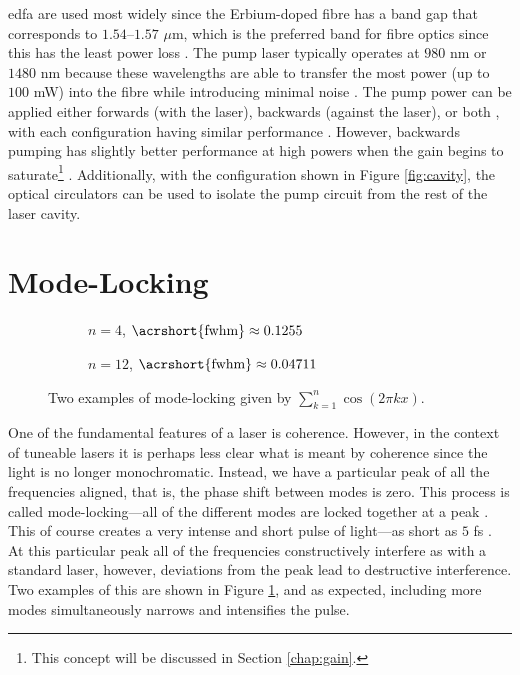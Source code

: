 \gls{edfa} are used most widely since the Erbium-doped fibre has a band gap that corresponds to $1.54$--$1.57$ $\mu$m, which is the preferred band for fibre optics since this has the least power loss \cite{agrawal2002, alazzawi, starodoumov}. The pump laser typically operates at $980$ nm or $1480$ nm because these wavelengths are able to transfer the most power (up to $100$ mW) into the fibre while introducing minimal noise \cite{agrawal2002, alazzawi, becker, starodoumov}. The pump power can be applied either forwards (with the laser), backwards (against the laser), or both \cite{alazzawi}, with each configuration having similar performance \cite{agrawal2002}. However, backwards pumping has slightly better performance at high powers when the gain begins to saturate\footnote{This concept will be discussed in Section \ref{chap:gain}.} \cite{agrawal2002}. Additionally, with the configuration shown in Figure \ref{fig:cavity}, the optical circulators can be used to isolate the pump circuit from the rest of the laser cavity. \\

\section{Mode-Locking}
\begin{figure}[tbp]
\centering
\begin{subfigure}{0.5\textwidth}

\caption{$n = 4$, $\text{\acrshort{fwhm}} \approx 0.1255$}
\end{subfigure}%
\begin{subfigure}{0.5\textwidth}

\caption{$n = 12$, $\text{\acrshort{fwhm}} \approx 0.04711$}
\end{subfigure}
\caption[Two examples of mode-locking.]{Two examples of mode-locking given by $\displaystyle \sum_{k = 1}^n \cos \left( 2 \pi k x \right)$.}
\label{fig:ml}
\end{figure}
One of the fundamental features of a laser is coherence. However, in the context of tuneable lasers it is perhaps less clear what is meant by coherence since the light is no longer monochromatic. Instead, we have a particular peak of all the frequencies aligned, that is, the phase shift between modes is zero. This process is called mode-locking---all of the different modes are locked together at a peak \cite{agrawal2013, hausbook, silfvast}. This of course creates a very intense and short pulse of light---as short as $5$ fs \cite{silfvast}. At this particular peak all of the frequencies constructively interfere as with a standard laser, however, deviations from the peak lead to destructive interference. Two examples of this are shown in Figure \ref{fig:ml}, and as expected, including more modes simultaneously narrows and intensifies the pulse. \\


